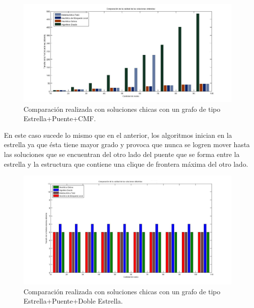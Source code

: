  \begin{figure}[H] %
\begin{center}
\includegraphics[width=400pt]{../imgs/calidadSolucionesChica14.jpg}
\caption{Comparación realizada con soluciones chicas con un grafo de tipo Estrella+Puente+CMF.}
\end{center}
\end{figure}



En este caso sucede lo mismo que en el anterior, los algoritmos inician en la estrella ya que ésta tiene mayor grado y provoca que nunca se logren mover hasta las soluciones que se encuentran del otro lado del puente que se forma entre la estrella y la estructura que contiene una clique de frontera máxima del otro lado.

 \begin{figure}[H] %
\begin{center}
\includegraphics[width=400pt]{../imgs/calidadSolucionesChicas17.jpg}
\caption{Comparación realizada con soluciones chicas con un grafo de tipo Estrella+Puente+Doble Estrella.}
\end{center}
\end{figure}


